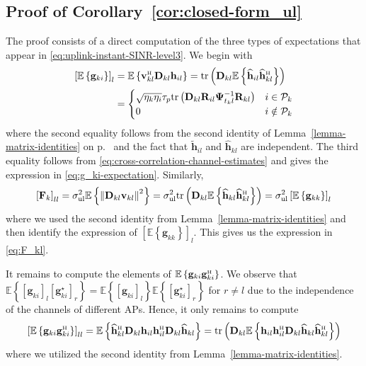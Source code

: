 \documentclass[SIG,biber]{nowfnt}
\newcommand{\vect}[1]{\mathbf{#1}}
\def\tr{\mathrm{tr}}
\def\Htran{\mbox{\tiny $\mathrm{H}$}}
\def\sigmaUL{\sigma^2_{\mathrm{ul}}}
\begin{document}
\subsection{Proof of Corollary~\ref{cor:closed-form_ul}}\label{proof-of-cor:closed-form_ul}
	
	The proof consists of a direct computation of the three types of expectations that appear in \eqref{eq:uplink-instant-SINR-level3}. We begin with
	\begin{align} \nonumber
	\left [ \mathbb{E} \left\{\vect{g}_{ki}\right\} \right ]_l &=	\mathbb{E} \left\{  \vect{v}_{kl}^{\Htran} \vect{D}_{kl} \vect{h}_{il} \right\} = \tr \left( \vect{D}_{kl} \mathbb{E} \left\{    \widehat{\vect{h}}_{il} \widehat{\vect{h}}_{kl}^{\Htran} \right\} \right) \\ &= \begin{cases}
	\sqrt{\eta_k\eta_i}\tau_p  \tr \left(  \vect{D}_{kl}  \vect{R}_{il}\vect{\Psi}_{t_kl}^{-1}\vect{R}_{kl} \right) &   i\in\mathcal{P}_k \\
	0 & i\notin\mathcal{P}_k
	\end{cases}
	\end{align}
	where the second equality follows from the second identity of Lemma~\ref{lemma-matrix-identities} on p.~\pageref{lemma-matrix-identities} and the fact that $\widetilde{\vect{h}}_{il}$ and $\widehat{\vect{h}}_{kl}$ are independent. The third equality follows from \eqref{eq:cross-correlation-channel-estimates} and gives the expression in \eqref{eq:g_ki-expectation}.
Similarly, 
\begin{align}
\left[ \vect{F}_k \right]_{ll}= \sigmaUL\mathbb{E} \left\{ \left\|  \vect{D}_{kl} \vect{v}_{kl} \right\|^2\right\} = \sigmaUL \tr \left( \vect{D}_{kl} \mathbb{E} \left\{    \widehat{\vect{h}}_{kl} \widehat{\vect{h}}_{kl}^{\Htran} \right\} \right) =\sigmaUL \left [ \mathbb{E} \left\{\vect{g}_{kk}\right\} \right ]_l
\end{align}
	where we used the second identity from Lemma~\ref{lemma-matrix-identities} and then identify the expression of $\left [ \mathbb{E} \left\{\vect{g}_{kk}\right\} \right ]_l$.
This gives us the expression in \eqref{eq:F_kl}.

It remains to compute the elements of $\mathbb{E}\left\{ \vect{g}_{ki} \vect{g}_{ki}^{\Htran}  \right\}$. We observe that $\mathbb{E}\left\{ \left[ \vect{g}_{ki} \right]_l \left[ \vect{g}_{ki}^{\star} \right]_r  \right\}=\mathbb{E}\left\{ \left[ \vect{g}_{ki} \right]_l\right\}\mathbb{E}\left\{ \left[ \vect{g}_{ki}^{\star} \right]_r\right\}$ for $ r\neq l$ due to the independence of the channels of different APs. Hence, it only remains to compute
\begin{equation}
\left[	\mathbb{E} \left\{\vect{g}_{ki} \vect{g}_{ki}^{\Htran}\right\} \right]_{ll}  =
\mathbb{E} \left\{\widehat{\vect{h}}_{kl}^{\Htran}\vect{D}_{kl} \vect{h}_{il}\vect{h}_{il}^{\Htran} \vect{D}_{kl}  \widehat{\vect{h}}_{kl} \right\} = \tr\left(\vect{D}_{kl}  \mathbb{E} \left\{ \vect{h}_{il}\vect{h}_{il}^{\Htran}  \vect{D}_{kl}\widehat{\vect{h}}_{kl} \widehat{\vect{h}}_{kl}^{\Htran} \right\} \right)
\end{equation}
where we utilized the second identity from Lemma~\ref{lemma-matrix-identities}.
\end{document}

